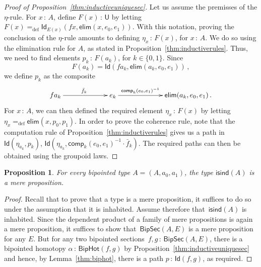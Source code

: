 \documentclass[10pt,a4paper,oneside,reqno]{amsart}
\numberwithin{equation}{section}
\theoremstyle{mythm}
\newtheorem{proposition}[theorem]{Proposition}
\theoremstyle{mydef}
\theoremstyle{myrmk}
\newcommand{\ie}{\text{i.e.\ }}
\newcommand{\defeq}{=_{\mathrm{def}}}
\newcommand{\co}{\,{:}\,}
\newcommand{\ct}{\cdot}
\newcommand{\isbipind}{\mathsf{isind}}
\newcommand{\Id}{\mathsf{Id}}
\newcommand{\U}{\mathsf{U}}
\newcommand{\BipHot}{\mathsf{BipHot}}
\newcommand{\BipSec}{\mathsf{BipSec}}
\newcommand{\elim}{\mathsf{elim}}
\newcommand{\comp}{\mathsf{comp}}
\begin{document}
\begin{proof}[Proof of Proposition~\ref{thm:inductiveuniquesec}] Let us assume the premisses of the $\eta$-rule. For $x \co A$, define $F(x) \co \U$  by letting $F(x) \defeq 
\Id_{E(x)}(fx, \elim(x, e_0, e_1))$. 
With this notation, proving the conclusion of the $\eta$-rule amounts to defining
$\eta_x \co F(x)$, for $x \co A$. We do so using the elimination rule for $A$, as stated in Proposition~\ref{thm:inductiverules}.
Thus, we need to find elements $p_k \co F(a_k)$, for $k \in \{0, 1\}$. Since
\[
F(a_k) = \Id(fa_k, \elim(a_k, e_0, e_1)) \, ,
\]
we define $p_k$ as the composite
\[
\xymatrix@C=2.2cm{
 fa_k \ar[r]^{\bar{f}_k} &
 e_k \ar[r]^-{ \comp_k(e_0, e_1)^{-1}}& 
  \elim(a_k, e_0, e_1)  \, .}
\]
For $x \co A$, we can then defined the required element $\eta_x \co F(x)$ by letting $\eta_x \defeq \elim(x, p_0, p_1)$.
In order to prove the coherence rule, note that the computation rule of Proposition~\ref{thm:inductiverules} gives us a path in $\Id(\eta_{a_k},  p_k)$, \ie  $\Id( \eta_{a_k},  \comp_k(e_0, e_1)^{-1} \ct \bar{f}_k ) $. 
The required paths can then be obtained using the groupoid laws.
 \end{proof} 

\begin{proposition} \label{thm:isbipindisprop} For every bipointed type $A = (A, a_0, a_1)$, the type $\isbipind(A)$ is a mere proposition.
\end{proposition}

\begin{proof} Recall that to prove that a type  is a mere proposition, it suffices to do so under the assumption that it is inhabited. Assume therefore that~$\isbipind(A)$ is inhabited. Since the dependent product of a family of mere propositions is again a mere proposition, it suffices to show that~$\BipSec(A,E)$ is a mere proposition for any $E$. But for any two bipointed sections~$f, g \co \BipSec(A,E)$,  there is a 
bipointed homotopy $\alpha \co \BipHot(f,g)$ by Proposition~\ref{thm:inductiveuniquesec} and hence, by 
Lemma~\ref{thm:biphot}, there is a path $p \co \Id(f,g)$, as required. 
\end{proof} 
\end{document}
